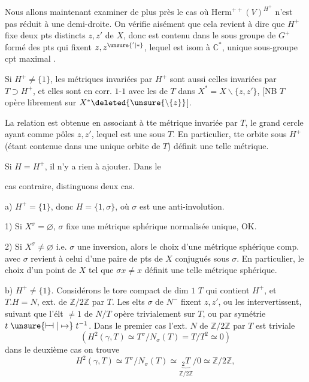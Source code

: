 

Nous allons maintenant examiner de plus près le cas où  $\mathrm{Herm}^{++}(V)^{H^+}$ n'est pas réduit à une demi-droite. On vérifie aisément que cela revient à dire que $H^+$  fixe deux pts distincts $z,z'$ de $X$, donc est contenu dans le sous groupe de $G^+$  formé des pts qui fixent $z,z^{\unsure{'|*}}$, lequel est isom à $\mathbb C^*$,   unique sous-groupe cpt maximal  . 

Si $H^+\ne\{1\}$,  les métriques invariées par $H^+$ sont aussi celles invariées par $T\supset H^+$,  et elles sont en corr. $1$-$1$ avec les   de $T$ dans $X^*=X\smallsetminus\{z,z'\}$, [NB $T$ opère librement sur $X^*\deleted{\unsure{\setminus\{z}}$].

La relation est obtenue en associant à tte métrique invariée par $T$,  le grand cercle ayant comme pôles $z,z'$, lequel est une   sous $T$. En particulier, tte orbite  sous $H^+$ (étant contenue dans une unique orbite de $T$) définit une telle métrique.

Si $H=H^+$, il n'y a  rien à ajouter. Dans le



cas contraire, distinguons deux cas.

a) $H^+=\{1\}$, donc $H=\{1,\sigma\}$, où $\sigma$ est une anti-involution.

1) Si \deleted{$\unsure{\sigma}$} $X^\sigma=\varnothing$, $\sigma$ fixe une métrique sphérique normalisée unique, OK.

2) Si $X^\sigma\ne\varnothing$ i.e. $\sigma$ une inversion, alors le choix d'une métrique sphérique comp. avec $\sigma$ revient à celui d'une paire de pts de $X$ conjugués sous $\sigma$. En particulier, le choix d'un point  de $X$ tel que $\sigma x\ne x$ définit une telle métrique sphérique.

b) $H^+\ne\{1\}$. Considérons le  tore  compact de dim $1$ $T$ qui contient $H^+$, et $T.H=N$, ext. de  $\mathbb Z/2\mathbb Z$ par $T$. Les elts  $\sigma$ de $N^-$ fixent $z,z'$, ou les intervertissent, suivant que l'élt $\ne1$ de $N/T$ opère trivialement sur $T$, ou par symétrie $t\mathrel{\unsure{\vdash\!\dashv|\mapsto}}t^{-1}$.
Dans le premier cas l'ext. $N$ de \inserted{$\gamma=$}$\mathbb Z/2\mathbb Z$ par $T$ est triviale
\[
(H^2(\gamma,T)\simeq T^\sigma/N_\sigma(T)=T/T^2\simeq0)
\]
dans le deuxième cas on trouve
\[
H^2(\gamma,T)\simeq T^\sigma/N_\sigma(T)\simeq \underbrace{{}_2T}_{\mathbb Z/2\mathbb Z}/0\simeq\mathbb Z/2\mathbb Z,
\]

